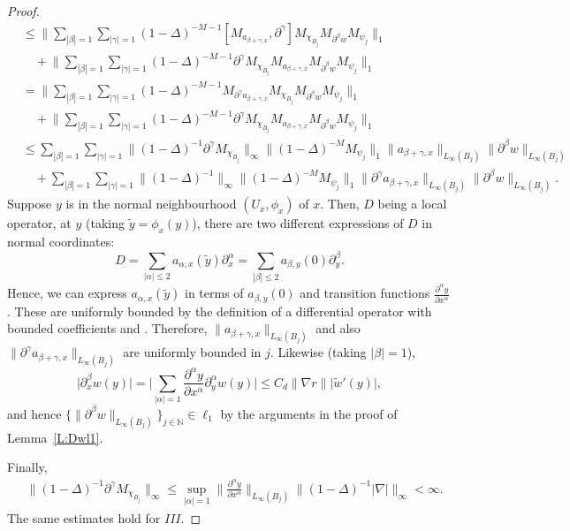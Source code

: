 \documentclass[pdftex]{sigma}
\numberwithin{equation}{section}
\begin{document}
\begin{proof}
\begin{align*}
&\leq \bigg\|\sum_{|\beta|=1}\sum_{|\gamma|=1} (1-\Delta)^{-M-1} [M_{a_{\beta+\gamma,x}}, \partial^\gamma] M_{\chi_{B_j}} M_{\partial^\beta w} M_{\psi_j}\bigg\|_1\\
& \quad + \bigg\|\sum_{|\beta|=1}\sum_{|\gamma|=1} (1-\Delta)^{-M-1} \partial^\gamma M_{\chi_{B_j}}M_{a_{\beta+\gamma,x}} M_{\partial^\beta w} M_{\psi_j}\bigg\|_1\\
&= \bigg\|\sum_{|\beta|=1}\sum_{|\gamma|=1} (1-\Delta)^{-M-1} M_{\partial^\gamma a_{\beta+\gamma,x}} M_{\chi_{B_j}} M_{\partial^\beta w} M_{\psi_j}\bigg\|_1\\
& \quad + \bigg\|\sum_{|\beta|=1}\sum_{|\gamma|=1} (1-\Delta)^{-M-1} \partial^\gamma M_{\chi_{B_j}}M_{a_{\beta+\gamma,x}} M_{\partial^\beta w} M_{\psi_j}\bigg\|_1\\
&\leq \sum_{|\beta|=1}\sum_{|\gamma|=1} \big\| (1-\Delta)^{-1} \partial^\gamma M_{\chi_{B_j}} \big\|_{\infty} \big\| (1-\Delta)^{-M}M_{\psi_j} \big\|_1 \| a_{\beta+\gamma,x}\|_{L_\infty (B_j)} \big\| \partial^\beta w\big\|_{L_\infty(B_j)}\\
& \quad + \sum_{|\beta|=1}\sum_{|\gamma|=1} \big\|(1-\Delta)^{-1}\big\|_\infty \big\| (1-\Delta)^{-M} M_{\psi_j}\big\|_{1} \big\|\partial^\gamma a_{\beta+\gamma,x}\big\|_{L_\infty (B_j)} \big\| \partial^\beta w \big\|_{L_\infty (B_j)}.
\end{align*}
Suppose $y$ is in the normal neighbourhood $(U_x,\phi_x)$ of $x$. Then, $D$ being a local operator, at $y$ (taking $\tilde{y} = \phi_x(y)$), there are two different expressions of $D$ in normal coordinates:
\[
D = \sum_{|\alpha| \leq 2} a_{\alpha, x}(\tilde{y}) \partial_x^\alpha = \sum_{|\beta|\leq 2} a_{\beta, y}(0) \partial_y^\beta.
\]
Hence, we can express $a_{\alpha, x}(\tilde{y})$ in terms of $a_{\beta, y}(0)$ and transition functions $\frac{\partial^\alpha y}{\partial x^\alpha}$. These are uniformly bounded by the definition of a differential operator with bounded coefficients and \cite[Proposition~1.3]{Kordyukov1991}. Therefore, $\|a_{\beta+\gamma,x}\|_{L_\infty (B_j)} $ and also $\|\partial^\gamma a_{\beta+\gamma,x}\|_{L_\infty (B_j)} $ are uniformly bounded in $j$. Likewise (taking $|\beta| = 1$),
\[
\big|\partial^\beta_x w (y)\big| = \bigg|\sum_{|\alpha|=1} \frac{\partial^\alpha y}{\partial x^\alpha} \partial^\alpha_y w(y) \bigg|
\leq C_d \| \nabla r\| \big|\tilde{w}'(y)\big|,
\]
and hence $\big\{\big\| \partial^\beta w \big\|_{L_\infty(B_j)}\big\}_{j \in \mathbb{N}} \in \ell_1$ by the arguments in the proof of Lemma~\ref{L:Dwl1}.

Finally,
\begin{align*}
&\big\| (1-\Delta)^{-1} \partial^\gamma M_{\chi_{B_j}} \big\|_{\infty}\leq \sup_{ |\alpha|=1} \bigg\|\frac{\partial^\alpha y}{\partial x^\alpha}\bigg\|_{L_{\infty}(B_j)} \big\| (1-\Delta)^{-1} |\nabla| \big\|_\infty < \infty.
\end{align*}
The same estimates hold for $III$.


\end{proof}
\end{document}
